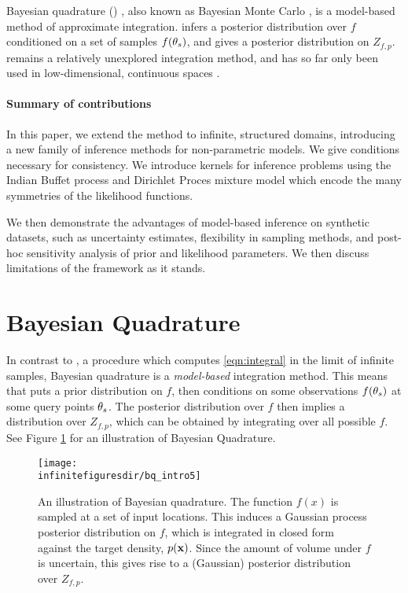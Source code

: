 
Bayesian quadrature (\bq{}) \cite{BZHermiteQuadrature}, also known as Bayesian Monte Carlo \cite{BZMonteCarlo}, is a model-based method of approximate integration.  \bq{} infers a posterior distribution over $f$ conditioned on a set of samples $f({\bf{\theta}}_s)$, and gives a posterior distribution on $Z_{f,p}$.  \bq{} remains a relatively unexplored integration method, and has so far only been used in low-dimensional, continuous spaces \cite{BZMonteCarlo}.

\paragraph{Summary of contributions} In this paper, we extend the \bq{} method to infinite, structured domains, introducing a new family of inference methods for non-parametric models.  We give conditions necessary for consistency.  We introduce kernels for inference problems using the Indian Buffet process and Dirichlet Proces mixture model which encode the many symmetries of the likelihood functions.

We then demonstrate the advantages of model-based inference on synthetic datasets, such as uncertainty estimates, flexibility in sampling methods, and post-hoc sensitivity analysis of prior and likelihood parameters.  We then discuss limitations of the framework as it stands.

\section{Bayesian Quadrature}

In contrast to \mcmc{}, a procedure which computes \eqref{eqn:integral} in the limit of infinite samples, Bayesian quadrature is a \emph{model-based} integration method.  This means that \bq{} puts a prior distribution on $f$, then conditions on some observations $f({\bf{\theta}}_s)$ at some query points ${\bf{\theta}}_s$.  The posterior distribution over $f$ then implies a distribution over $Z_{f,p}$, which can be obtained by integrating over all possible $f$.  See Figure \ref{fig:bq_intro} for an illustration of Bayesian Quadrature.

\begin{figure}
\centering
\texttt{[image: \\infinitefiguresdir/bq\_intro5]}
\caption[An illustration of Bayesian quadrature]
{An illustration of Bayesian quadrature.  The function $f(x)$ is sampled at a set of input locations.  This induces a Gaussian process posterior distribution on $f$, which is integrated in closed form against the target density, $p({\bf{x}})$.  Since the amount of volume under $f$ is uncertain, this gives rise to a (Gaussian) posterior distribution over $Z_{f,p}$.}
\label{fig:bq_intro}
\end{figure}

